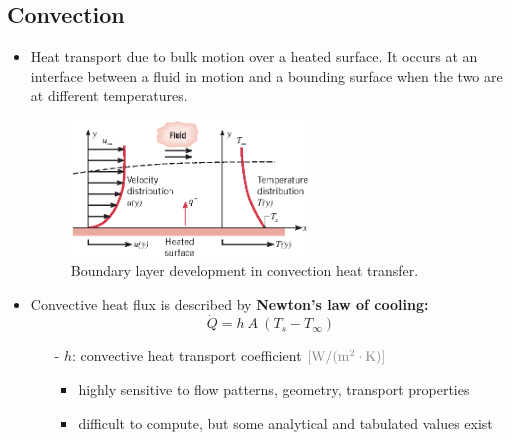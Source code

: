 \documentclass[12pt, a4paper]{article}
\begin{document}
\subsection{Convection}
\begin{itemize}
    \item Heat transport due to bulk motion over a heated surface. It occurs at an interface between a fluid in motion and a bounding surface when the two are at different temperatures.

    \begin{figure}[H]
        \centering
        \includegraphics[width = 0.6\textwidth]{img/convection.eps}
        \caption{Boundary layer development in convection heat transfer.}
    \end{figure}

    \item Convective heat flux is described by \textbf{Newton’s law of cooling:}
    \[ 
        \dot{Q} = h \ A \ (T_{s} - T_{\infty}) 
    \]
    
    \begin{itemize}
        \item[-] $h$: convective heat transport coefficient $\color{gray}{\mathrm{[W/(m^{2}\cdot K)]}}$
        \begin{itemize}
            \item highly sensitive to flow patterns, geometry, transport properties
            \item difficult to compute, but some analytical and tabulated values exist
        \end{itemize}
    \end{itemize}


\end{itemize}
\end{document}
